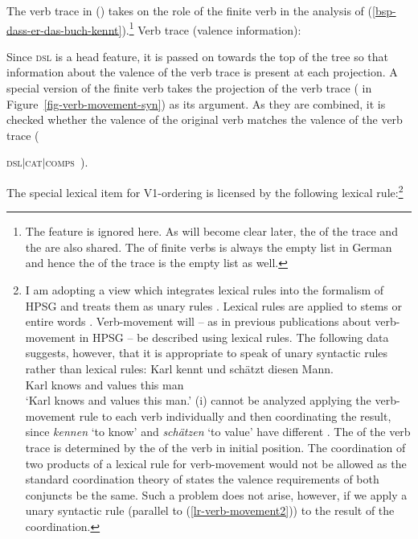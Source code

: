 {The verb trace in () takes on the role of the finite verb in the analysis of
(\ref{bsp-dass-er-das-buch-kennt}).\footnote{
  The \spr feature is ignored here. As will become clear later, the \sprv of the trace and the
  \dslf are also shared. The \sprv of finite verbs is always the empty list in German and hence the
  \sprv of the trace is the empty list as well.
}
\eas
Verb trace (valence information):\\
\label{le-verbspur}
\zs


Since \textsc{dsl} is a head feature, it is passed on towards the top of the tree so that information
about the valence of the verb trace is present at each projection.
A special version of the finite verb takes the projection of the verb trace ( in Figure~\vref{fig-verb-movement-syn}) as its argument. As they are combined,
it is checked whether the valence of the original verb  matches the valence of the verb
trace ({\textsc{dsl$|$cat$|$comps} \,).

The special lexical item for V1-ordering is licensed by the following lexical rule:\footnote{\label{fn-koord-vm}%
		I am adopting a view which integrates lexical rules into the formalism of HPSG and treats them as
		unary rules \citep{Meurers2001a}.
		Lexical rules are applied to stems or entire words \citep{Mueller2002b}.
		Verb-movement will -- as in previous publications about verb-movement in HPSG -- be described using 
		lexical rules. The following data suggests, however, that it is appropriate to speak of unary syntactic rules rather than lexical rules:
		 \ea
        \gll Karl kennt und schätzt diesen Mann.\\
             Karl knows and values this man\\
	\glt `Karl knows and values this man.'
        \z
		(i) cannot be analyzed applying the verb-movement rule to each verb individually and then coordinating the
		result, since \emph{kennen} `to know' and \emph{schätzen} `to value' have different \contvs. The \contv
		of the verb trace is determined by the \contv of the verb in initial position. The coordination of two products of
		a lexical rule for verb-movement would not be allowed as the standard coordination theory of \citet[]{ps2} states
		the valence requirements of both conjuncts be the same. Such a problem does not arise, however, if we apply a unary syntactic 
		rule (parallel to (\ref{lr-verb-movement2})) to the result of the coordination.%
}


}}
